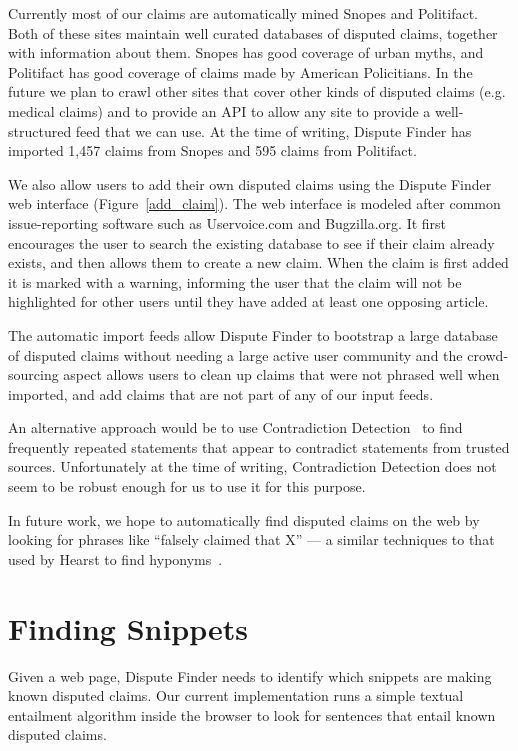 \documentclass{www2010-submission}
\newcommand{\todo}[1]{}
\begin{document}
Currently most of our claims are automatically mined Snopes and Politifact. Both of these sites maintain well curated databases of disputed claims, together with information about them. Snopes has good coverage of urban myths, and Politifact has good coverage of claims made by American Policitians. In the future we plan to crawl other sites that cover other kinds of disputed claims (e.g. medical claims) and to provide an API to allow any site to provide a well-structured feed that we can use. At the time of writing, Dispute Finder has imported 1,457 claims from Snopes and 595 claims from Politifact. 

We also allow users to add their own disputed claims using the Dispute Finder web interface (Figure~\ref{add_claim}). The web interface is modeled after common issue-reporting software such as Uservoice.com and Bugzilla.org. It first encourages the user to search the existing database to see if their claim already exists, and then allows them to create a new claim. When the claim is first added it is marked with a warning, informing the user that the claim will not be highlighted for other users until they have added at least one opposing article.

The automatic import feeds allow Dispute Finder to bootstrap a large database of disputed claims without needing a large active user community and the crowd-sourcing aspect allows users to clean up claims that were not phrased well when imported, and add claims that are not part of any of our input feeds.

An alternative approach would be to use Contradiction Detection~\cite{Ritter} to find frequently repeated statements that appear to contradict statements from trusted sources. Unfortunately at the time of writing, Contradiction Detection does not seem to be robust enough for us to use it for this purpose.

In future work, we hope to automatically find disputed claims on the web by looking for phrases like ``falsely claimed that X'' --- a similar techniques to that used by Hearst to find hyponyms~\cite{Hearst1992}. 

\todo{Say how many disputed claims}
\todo{talk about duplicates}
\todo{Actually import the Politifact data}


\section{Finding Snippets}

Given a web page, Dispute Finder needs to identify which snippets are making known disputed claims. Our current implementation runs a simple textual entailment algorithm inside the browser to look for sentences that entail known disputed claims. 
\end{document}
